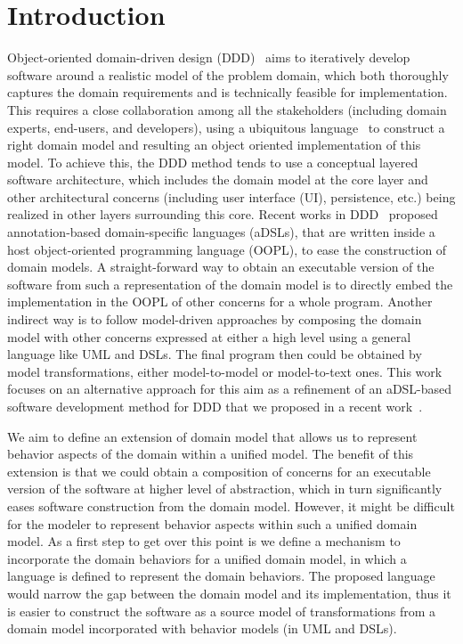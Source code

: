 %
\section{Introduction}\label{sect:introduction}
Object-oriented domain-driven design (DDD)~\cite{evans_domain-driven_2004} aims to iteratively develop software around a realistic model of the problem domain, which both thoroughly captures the domain requirements and is technically feasible for implementation. This requires a close collaboration among all the stakeholders (including domain experts, end-users, and developers), using a ubiquitous language~\cite{evans_domain-driven_2004} to construct a right domain model and resulting an object oriented implementation of this model. To achieve this, the DDD method tends to use a conceptual layered software architecture, which includes the domain model at the core layer and other architectural concerns (including user interface (UI), persistence, etc.) being realized in other layers surrounding this core. %
%
%
Recent works in DDD~\cite{dan_haywood_apache_2013, paniza_learn_2011} proposed  annotation-based domain-specific languages (aDSLs), that are written inside a host object-oriented programming language (OOPL), to ease the construction of domain models. A straight-forward way to obtain an executable version of the software from such a representation of the domain model is to directly embed the implementation in the OOPL of other concerns for a whole program. Another indirect way is to follow model-driven approaches by composing the domain model with other concerns expressed at either a high level using a general language like UML and DSLs. The final program then could be obtained by model transformations, either model-to-model or model-to-text ones. This work focuses on an alternative approach for this aim as a refinement of an aDSL-based software development method for DDD that we proposed in a recent work~\cite{le_domain_2018}. 

We aim to define an extension of domain model that allows us to represent behavior aspects of the domain within a unified model. The benefit of this extension is that we could obtain a composition of concerns for an executable version of the software at higher level of abstraction, which in turn significantly eases software construction from the domain model. However, it might be difficult for the modeler to represent behavior aspects within such a unified domain model. As a first step to get over this point is we define a mechanism to incorporate the domain behaviors for a unified domain model, in which a language is defined to represent the domain behaviors. The proposed language would narrow the gap between the domain model and its implementation, thus it is easier to construct the software as a source model of transformations from a domain model incorporated with behavior models (in UML and DSLs).


